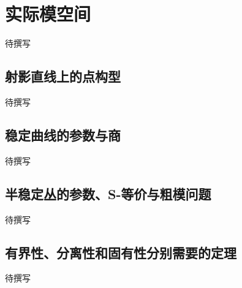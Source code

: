 
% 
% 
% 
% 

\section{实际模空间}
\label{g5:sec:3404}

待撰写

\subsection{射影直线上的点构型}
\label{g5:subsec:3404:01}
待撰写

\subsection{稳定曲线的参数与商}
\label{g5:subsec:3404:02}
待撰写

\subsection{半稳定丛的参数、S-等价与粗模问题}
\label{g5:subsec:3404:03}
待撰写

\subsection{有界性、分离性和固有性分别需要的定理}
\label{g5:subsec:3404:04}
待撰写
